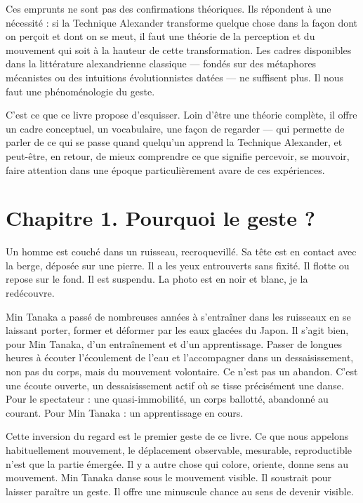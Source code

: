 \documentclass[
  french,
  letterpaper,
  DIV=11,
  numbers=noendperiod]{scrreprt}
\begin{document}
Ces emprunts ne sont pas des confirmations théoriques. Ils répondent à
une nécessité : si la Technique Alexander transforme quelque chose dans
la façon dont on perçoit et dont on se meut, il faut une théorie de la
perception et du mouvement qui soit à la hauteur de cette
transformation. Les cadres disponibles dans la littérature alexandrienne
classique --- fondés sur des métaphores mécanistes ou des intuitions
évolutionnistes datées --- ne suffisent plus. Il nous faut une
phénoménologie du geste.

C'est ce que ce livre propose d'esquisser. Loin d'être une théorie
complète, il offre un cadre conceptuel, un vocabulaire, une façon de
regarder --- qui permette de parler de ce qui se passe quand quelqu'un
apprend la Technique Alexander, et peut-être, en retour, de mieux
comprendre ce que signifie percevoir, se mouvoir, faire attention dans
une époque particulièrement avare de ces expériences.


\chapter{\texorpdfstring{\textbf{Chapitre 1. Pourquoi le geste
?}}{Chapitre 1. Pourquoi le geste ?}}\label{chapitre-1.-pourquoi-le-geste}

Un homme est couché dans un ruisseau, recroquevillé. Sa tête est en
contact avec la berge, déposée sur une pierre. Il a les yeux entrouverts
sans fixité. Il flotte ou repose sur le fond. Il est suspendu. La photo
est en noir et blanc, je la redécouvre.

Min Tanaka a passé de nombreuses années à s'entraîner dans les ruisseaux
en se laissant porter, former et déformer par les eaux glacées du Japon.
Il s'agit bien, pour Min Tanaka, d'un entraînement et d'un
apprentissage. Passer de longues heures à écouter l'écoulement de l'eau
et l'accompagner dans un dessaisissement, non pas du corps, mais du
mouvement volontaire. Ce n'est pas un abandon. C'est une écoute ouverte,
un dessaisissement actif où se tisse précisément une danse. Pour le
spectateur : une quasi-immobilité, un corps ballotté, abandonné au
courant. Pour Min Tanaka : un apprentissage en cours.

Cette inversion du regard est le premier geste de ce livre. Ce que nous
appelons habituellement mouvement, le déplacement observable, mesurable,
reproductible n'est que la partie émergée. Il y a autre chose qui
colore, oriente, donne sens au mouvement. Min Tanaka danse sous le
mouvement visible. Il soustrait pour laisser paraître un geste. Il offre
une minuscule chance au sens de devenir visible.
\end{document}
